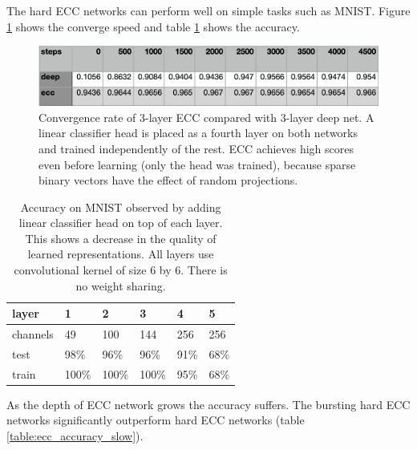 \documentclass[oneside,english,logo]{amuthesis}
\begin{document}
The hard ECC networks can perform well on simple tasks such as MNIST. Figure \ref{fig:convergence_rate} shows the converge speed and table \ref{table:ecc_accuracy} shows the accuracy.
\begin{figure}[!htbp]
	\centering
	\includegraphics[width=13.5cm]{convergence_rate}
	\caption{Convergence rate of 3-layer ECC compared with 3-layer deep net. A linear classifier head is placed as a fourth layer on both networks and trained independently of the rest. ECC achieves high scores even before learning (only the head was trained), because sparse binary vectors have the effect of random projections.}
	\label{fig:convergence_rate}
\end{figure} 
\begin{table}[]
	\begin{tabular}{|llllll|}
		\hline
		layer    & 1     & 2     & 3     & 4    & 5    \\ \hline
		channels & 49    & 100   & 144   & 256  & 256  \\ 
		test    & 98\%  & 96\%  & 96\%  & 91\% & 68\% \\ 
		train     & 100\% & 100\% & 100\% & 95\% & 68\% \\ \hline
	\end{tabular}
	\caption{Accuracy on MNIST observed by adding linear classifier head on top of each layer. This shows a decrease in the quality of learned representations. All layers use convolutional kernel of size 6 by 6. There is no weight sharing.}
	\label{table:ecc_accuracy}
\end{table}
As the depth of ECC network grows the accuracy suffers. 
The bursting hard ECC networks significantly outperform hard ECC networks (table \ref{table:ecc_accuracy_slow}). 
\begin{table}[]
	
	\caption{Each layer with even number is a convolutional bursting hard ECC. The odd layers are not bursting. The kernel size is 6x6 for odd and 1x1 for even layers. An interesting observation is that bursting allows for significant reduction in number of channels. During evaluation bursting is disabled.}
	\label{table:ecc_accuracy_slow}
\end{table}
\end{document}
